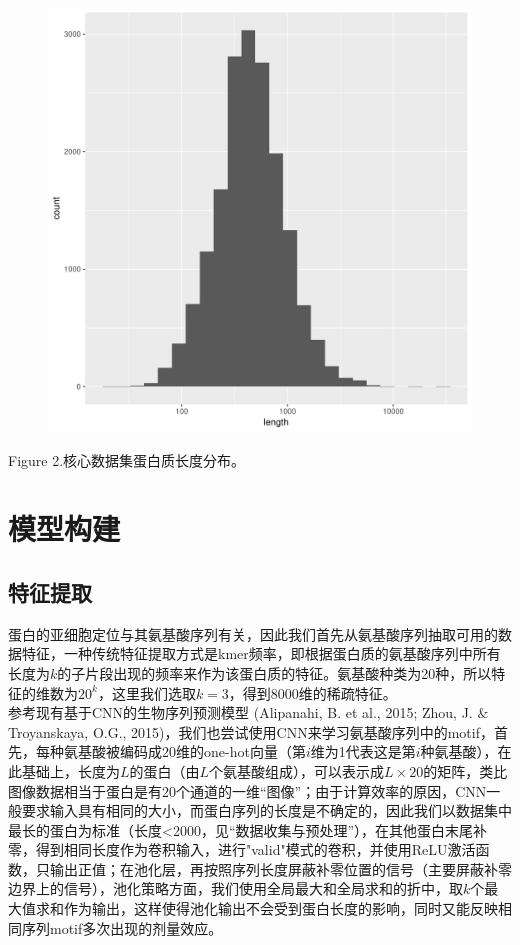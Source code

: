 \documentclass[a4paper,UTF8]{article}
\begin{document}
\begin{figure}[H]
	\centering\includegraphics[scale=0.5]{../data/summary/seqlen.pdf}
\end{figure}
Figure 2.核心数据集蛋白质长度分布。

\section{模型构建}

\subsection{特征提取}

蛋白的亚细胞定位与其氨基酸序列有关，因此我们首先从氨基酸序列抽取可用的数据特征，一种传统特征提取方式是kmer频率，即根据蛋白质的氨基酸序列中所有长度为$k$的子片段出现的频率来作为该蛋白质的特征。氨基酸种类为20种，所以特征的维数为$20^k$，这里我们选取$k=3$，得到8000维的稀疏特征。\\

参考现有基于CNN的生物序列预测模型 (Alipanahi, B. et al., 2015; Zhou, J. $\&$ Troyanskaya, O.G., 2015)，我们也尝试使用CNN来学习氨基酸序列中的motif，首先，每种氨基酸被编码成20维的one-hot向量（第$i$维为1代表这是第$i$种氨基酸），在此基础上，长度为$L$的蛋白（由$L$个氨基酸组成），可以表示成$L\times 20$的矩阵，类比图像数据相当于蛋白是有20个通道的一维“图像”；由于计算效率的原因，CNN一般要求输入具有相同的大小，而蛋白序列的长度是不确定的，因此我们以数据集中最长的蛋白为标准（长度<2000，见“数据收集与预处理”），在其他蛋白末尾补零，得到相同长度作为卷积输入，进行"valid"模式的卷积，并使用ReLU激活函数，只输出正值；在池化层，再按照序列长度屏蔽补零位置的信号（主要屏蔽补零边界上的信号），池化策略方面，我们使用全局最大和全局求和的折中，取$k$个最大值求和作为输出，这样使得池化输出不会受到蛋白长度的影响，同时又能反映相同序列motif多次出现的剂量效应。\\
\end{document}

